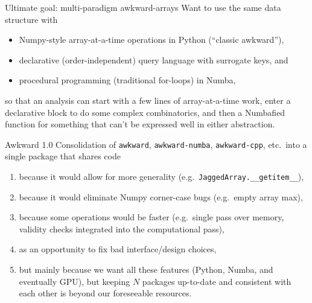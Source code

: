 \documentclass[aspectratio=169]{beamer}
\begin{document}
\begin{frame}{Ultimate goal: multi-paradigm awkward-arrays}
\large
\vspace{0.5 cm}
{\Large Want to use the same data structure with}

\vspace{0.15 cm}
\begin{itemize}
\item Numpy-style array-at-a-time operations in Python (``classic awkward''),
\item declarative (order-independent) query language with surrogate keys, and
\item procedural programming (traditional for-loops) in Numba,
\end{itemize}

\vspace{0.15 cm}
so that an analysis can start with a few lines of array-at-a-time work, enter a declarative block to do some complex combinatorics, and then a Numbafied function for something that can't be expressed well in either abstraction.
\end{frame}

\begin{frame}{Awkward 1.0}
\Large
\vspace{0.5 cm}
Consolidation of {\tt awkward}, {\tt awkward-numba}, {\tt awkward-cpp}, etc.\ into a single package that shares code

\large
\vspace{0.15 cm}
\begin{enumerate}\setlength{\itemsep}{0.3 cm}
\item because it would allow for more generality \mbox{(e.g.\ {\normalsize \texttt{JaggedArray.__getitem__}}),\hspace{-1 cm}}
\item because it would eliminate Numpy corner-case bugs (e.g.\ empty array max),
\item because some operations would be faster (e.g.\ single pass over memory, validity checks integrated into the computational pass),
\item as an opportunity to fix bad interface/design choices,
\item but mainly because we want all these features (Python, Numba, and eventually GPU), but keeping $N$ packages up-to-date and consistent with each other is beyond our foreseeable resources.
\end{enumerate}
\end{frame}
\end{document}
